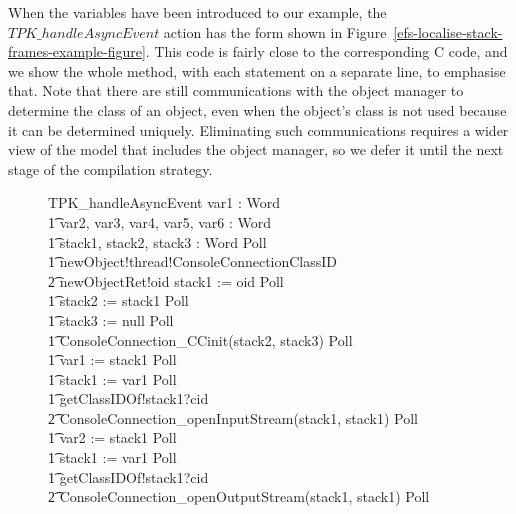 When the variables have been introduced to our example, the
$TPK\_handleAsyncEvent$ action has the form shown in
Figure~\ref{efs-localise-stack-frames-example-figure}.
This code is fairly close to the corresponding C code, and we show the
whole method, with each statement on a separate line, to emphasise
that.
Note that there are still communications with the object manager to
determine the class of an object, even when the object's class is not
used because it can be determined uniquely.
Eliminating such communications requires a wider view of the model
that includes the object manager, so we defer it until the next stage
of the compilation strategy.

\begin{figure}[tp!]
  \centering
  \setlength{\zedtab}{0.5cm}
  \setlength{\zedindent}{0pt}
  \setlength{\zedleftsep}{0pt}
  \setlength{\abovedisplayskip}{0pt}
  \setlength{\belowdisplayskip}{0pt}
  \setlength{\abovedisplayshortskip}{0pt}
  \setlength{\belowdisplayshortskip}{0pt}
  \begin{circusaction}
    TPK\_handleAsyncEvent \circdef \circval var1 : Word \circspot \\
    \t1 \circvar var2, var3, var4, var5, var6 : Word \circspot \\
    \t1 \circvar stack1, stack2, stack3 : Word \circspot Poll \circseq \\
    \t1 newObject!thread!ConsoleConnectionClassID \\
    \t2 {} \then newObjectRet!oid \then stack1 := oid \circseq Poll \circseq \\
    \t1 stack2 := stack1 \circseq Poll \circseq \\
    \t1 stack3 := null \circseq Poll \circseq \\
    \t1 ConsoleConnection\_CCinit(stack2, stack3) \circseq Poll \circseq \\
    \t1 var1 := stack1 \circseq Poll \circseq \\
    \t1 stack1 := var1 \circseq Poll \circseq \\
    \t1 getClassIDOf!stack1?cid \\
    \t2 {} \then ConsoleConnection\_openInputStream(stack1, stack1) \circseq Poll \circseq \\
    \t1 var2 := stack1 \circseq Poll \circseq \\
    \t1 stack1 := var1 \circseq Poll \circseq \\
    \t1 getClassIDOf!stack1?cid \\
    \t2 {} \then ConsoleConnection\_openOutputStream(stack1, stack1) \circseq Poll \circseq \\

\end{circusaction}
\end{figure}
